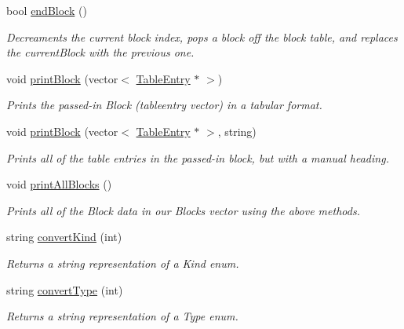 \begin{DoxyCompactItemize}
bool \hyperlink{classBlockTable_af91746a425e587ff501359f1df179ca8}{endBlock} ()
\begin{DoxyCompactList}\small\item\em Decreaments the current block index, pops a block off the block table, and replaces the currentBlock with the previous one. \item\end{DoxyCompactList}\item 
void \hyperlink{classBlockTable_a06df0e10b6d3d810ee66e6f0a7373c6b}{printBlock} (vector$<$ \hyperlink{structTableEntry}{TableEntry} $\ast$ $>$)
\begin{DoxyCompactList}\small\item\em Prints the passed-\/in Block (tableentry vector) in a tabular format. \item\end{DoxyCompactList}\item 
void \hyperlink{classBlockTable_a7f4d48d59c7fab073a3b107a29d873a6}{printBlock} (vector$<$ \hyperlink{structTableEntry}{TableEntry} $\ast$ $>$, string)
\begin{DoxyCompactList}\small\item\em Prints all of the table entries in the passed-\/in block, but with a manual heading. \item\end{DoxyCompactList}\item 
void \hyperlink{classBlockTable_af1f2d9c57b11b3cf7f55b31021d85c88}{printAllBlocks} ()
\begin{DoxyCompactList}\small\item\em Prints all of the Block data in our Blocks vector using the above methods. \item\end{DoxyCompactList}\item 
string \hyperlink{classBlockTable_ac9a83858d9184169f92781ef26bf603a}{convertKind} (int)
\begin{DoxyCompactList}\small\item\em Returns a string representation of a Kind enum. \item\end{DoxyCompactList}\item 
string \hyperlink{classBlockTable_a325649dd7ce1533f3e06520ca2b6bc0a}{convertType} (int)
\begin{DoxyCompactList}\small\item\em Returns a string representation of a Type enum. \item\end{DoxyCompactList}\item 

\end{DoxyCompactItemize}
